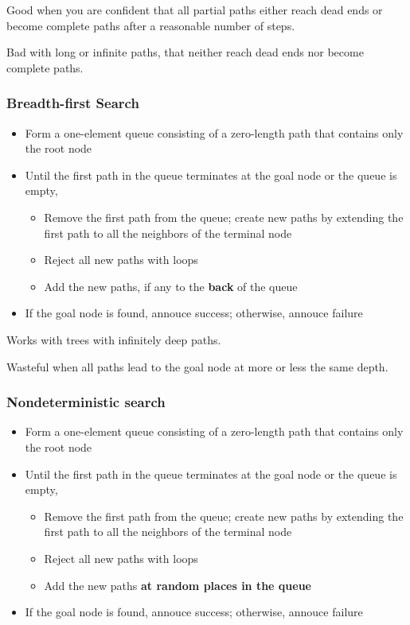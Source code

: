 Good when you are confident that all partial paths either reach dead ends
or become complete paths after a reasonable number of steps.

Bad with long or infinite paths, that neither reach dead ends 
nor become complete paths.

\subsubsection{Breadth-first Search}

\begin{itemize}
  \item Form a one-element queue consisting of a zero-length path
    that contains only the root node
  \item Until the first path in the queue terminates at the goal node 
    or the queue is empty,
    \begin{itemize}
      \item Remove the first path from the queue; create new paths
        by extending the first path to all the neighbors of the 
        terminal node
      \item Reject all new paths with loops
      \item Add the new paths, if any to the \textbf{back} of the queue
    \end{itemize}
  \item If the goal node is found, annouce success; otherwise, annouce 
    failure
\end{itemize}


Works with trees with infinitely deep paths.

Wasteful when all paths lead to the goal node at more or less the same depth.

\subsubsection{Nondeterministic search}

\begin{itemize}
  \item Form a one-element queue consisting of a zero-length path
    that contains only the root node
  \item Until the first path in the queue terminates at the goal node 
    or the queue is empty,
    \begin{itemize}
      \item Remove the first path from the queue; create new paths
        by extending the first path to all the neighbors of the 
        terminal node
      \item Reject all new paths with loops
      \item Add the new paths \textbf{at random places in the queue}
    \end{itemize}
  \item If the goal node is found, annouce success; otherwise, annouce 
    failure
\end{itemize}

